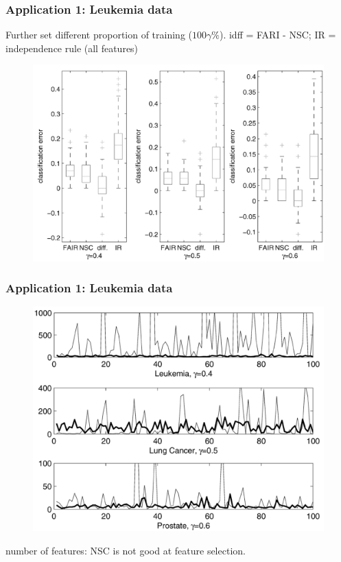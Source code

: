 \documentclass{beamer}
\begin{document}
	\begin{frame}
		\frametitle{Application 1: Leukemia data}
		Further set different proportion of training ($100\gamma\%$). idff = FARI - NSC; IR = independence rule (all features)
			\begin{figure}
			\includegraphics[width=.8\linewidth]{image017.png}
			\end{figure} 
	\end{frame}
	
	\begin{frame}
		\frametitle{Application 1: Leukemia data}
		\begin{figure}
			\includegraphics[width=.7\linewidth]{image018.png}
		\end{figure} 
		number of features: NSC is not good at feature selection.
	\end{frame}
	
\end{document}
